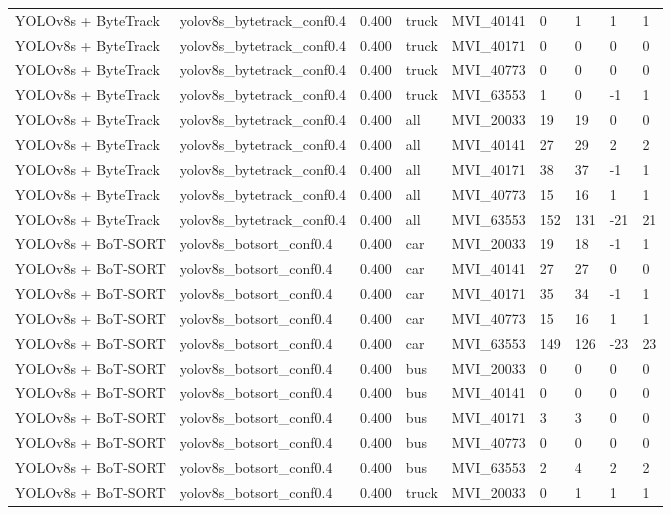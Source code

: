 \begin{tabular}{lllllllll}
YOLOv8s + ByteTrack & yolov8s\_bytetrack\_conf0.4 & 0.400 & truck & MVI\_40141 & 0 & 1 & 1 & 1 \\
YOLOv8s + ByteTrack & yolov8s\_bytetrack\_conf0.4 & 0.400 & truck & MVI\_40171 & 0 & 0 & 0 & 0 \\
YOLOv8s + ByteTrack & yolov8s\_bytetrack\_conf0.4 & 0.400 & truck & MVI\_40773 & 0 & 0 & 0 & 0 \\
YOLOv8s + ByteTrack & yolov8s\_bytetrack\_conf0.4 & 0.400 & truck & MVI\_63553 & 1 & 0 & -1 & 1 \\
YOLOv8s + ByteTrack & yolov8s\_bytetrack\_conf0.4 & 0.400 & all & MVI\_20033 & 19 & 19 & 0 & 0 \\
YOLOv8s + ByteTrack & yolov8s\_bytetrack\_conf0.4 & 0.400 & all & MVI\_40141 & 27 & 29 & 2 & 2 \\
YOLOv8s + ByteTrack & yolov8s\_bytetrack\_conf0.4 & 0.400 & all & MVI\_40171 & 38 & 37 & -1 & 1 \\
YOLOv8s + ByteTrack & yolov8s\_bytetrack\_conf0.4 & 0.400 & all & MVI\_40773 & 15 & 16 & 1 & 1 \\
YOLOv8s + ByteTrack & yolov8s\_bytetrack\_conf0.4 & 0.400 & all & MVI\_63553 & 152 & 131 & -21 & 21 \\
YOLOv8s + BoT-SORT & yolov8s\_botsort\_conf0.4 & 0.400 & car & MVI\_20033 & 19 & 18 & -1 & 1 \\
YOLOv8s + BoT-SORT & yolov8s\_botsort\_conf0.4 & 0.400 & car & MVI\_40141 & 27 & 27 & 0 & 0 \\
YOLOv8s + BoT-SORT & yolov8s\_botsort\_conf0.4 & 0.400 & car & MVI\_40171 & 35 & 34 & -1 & 1 \\
YOLOv8s + BoT-SORT & yolov8s\_botsort\_conf0.4 & 0.400 & car & MVI\_40773 & 15 & 16 & 1 & 1 \\
YOLOv8s + BoT-SORT & yolov8s\_botsort\_conf0.4 & 0.400 & car & MVI\_63553 & 149 & 126 & -23 & 23 \\
YOLOv8s + BoT-SORT & yolov8s\_botsort\_conf0.4 & 0.400 & bus & MVI\_20033 & 0 & 0 & 0 & 0 \\
YOLOv8s + BoT-SORT & yolov8s\_botsort\_conf0.4 & 0.400 & bus & MVI\_40141 & 0 & 0 & 0 & 0 \\
YOLOv8s + BoT-SORT & yolov8s\_botsort\_conf0.4 & 0.400 & bus & MVI\_40171 & 3 & 3 & 0 & 0 \\
YOLOv8s + BoT-SORT & yolov8s\_botsort\_conf0.4 & 0.400 & bus & MVI\_40773 & 0 & 0 & 0 & 0 \\
YOLOv8s + BoT-SORT & yolov8s\_botsort\_conf0.4 & 0.400 & bus & MVI\_63553 & 2 & 4 & 2 & 2 \\
YOLOv8s + BoT-SORT & yolov8s\_botsort\_conf0.4 & 0.400 & truck & MVI\_20033 & 0 & 1 & 1 & 1 \\

\end{tabular}
